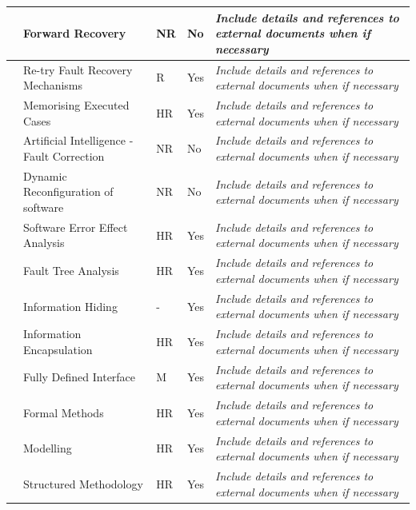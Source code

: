 \documentclass{template/openetcs_article}
\begin{document}
\begin{flushleft}
\begin{supertabular}[H]{|m{1cm}|m{5cm}|m{1cm}|m{2cm}|m{5cm}|}
 &
Forward Recovery &
\centering
NR &
\centering
No &
\textit{Include details and references to external documents when if necessary}\\\hline
{} &
Re-try Fault Recovery Mechanisms &
\centering
R &
\centering
Yes &
\textit{Include details and references to external documents when if necessary}\\\hline
{} &
Memorising Executed Cases &
\centering
HR &
\centering
Yes &
\textit{Include details and references to external documents when if necessary}\\\hline
{} &
Artificial Intelligence - Fault Correction &
\centering
NR &
\centering
No &
\textit{Include details and references to external documents when if necessary}\\\hline
{} &
Dynamic Reconfiguration of software &
\centering
NR &
\centering
No &
\textit{Include details and references to external documents when if necessary}\\\hline
{} &
Software Error Effect Analysis &
\centering
HR &
\centering
Yes &
\textit{Include details and references to external documents when if necessary}\\\hline
{} &
Fault Tree Analysis &
\centering
HR &
\centering
Yes &
\textit{Include details and references to external documents when if necessary}\\\hline
{} &
Information Hiding &
\centering
- &
\centering
Yes &
\textit{Include details and references to external documents when if necessary}\\\hline
{} &
Information Encapsulation &
\centering
HR &
\centering
Yes &
\textit{Include details and references to external documents when if necessary}\\\hline
{} &
Fully Defined Interface &
\centering
M &
\centering
Yes &
\textit{Include details and references to external documents when if necessary}\\\hline
{} &
Formal Methods &
\centering
HR &
\centering
Yes &
\textit{Include details and references to external documents when if necessary}\\\hline
{} &
Modelling &
\centering
HR &
\centering
Yes &
\textit{Include details and references to external documents when if necessary}\\\hline
{} &
Structured Methodology &
\centering
HR &
\centering
Yes &
\textit{Include details and references to external documents when if necessary}\\\hline

\end{supertabular}
\end{flushleft}
\end{document}
